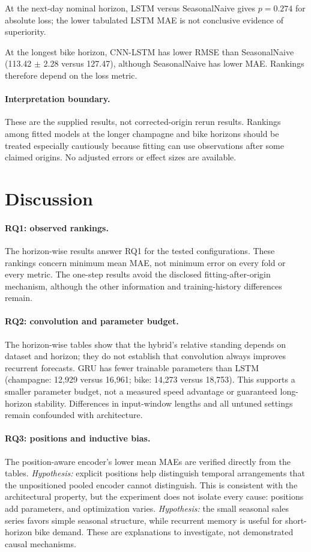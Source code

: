 \documentclass[10pt,a4paper]{article}
\begin{document}
At the next-day nominal horizon, LSTM versus SeasonalNaive gives $p=0.274$ for absolute loss; the lower tabulated LSTM MAE is not conclusive evidence of superiority.

At the longest bike horizon, CNN-LSTM has lower RMSE than SeasonalNaive (113.42 $\pm$ 2.28 versus 127.47), although SeasonalNaive has lower MAE. Rankings therefore depend on the loss metric.

\paragraph{Interpretation boundary.} These are the supplied results, not corrected-origin rerun results. Rankings among fitted models at the longer champagne and bike horizons should be treated especially cautiously because fitting can use observations after some claimed origins. No adjusted errors or effect sizes are available.

\section{Discussion}
\paragraph{RQ1: observed rankings.} The horizon-wise results answer RQ1 for the tested configurations. These rankings concern minimum mean MAE, not minimum error on every fold or every metric. The one-step results avoid the disclosed fitting-after-origin mechanism, although the other information and training-history differences remain.

\paragraph{RQ2: convolution and parameter budget.} The horizon-wise tables show that the hybrid's relative standing depends on dataset and horizon; they do not establish that convolution always improves recurrent forecasts. GRU has fewer trainable parameters than LSTM (champagne: 12,929 versus 16,961; bike: 14,273 versus 18,753). This supports a smaller parameter budget, not a measured speed advantage or guaranteed long-horizon stability. Differences in input-window lengths and all untuned settings remain confounded with architecture.

\paragraph{RQ3: positions and inductive bias.} The position-aware encoder's lower mean MAEs are verified directly from the tables. \emph{Hypothesis:} explicit positions help distinguish temporal arrangements that the unpositioned pooled encoder cannot distinguish. This is consistent with the architectural property, but the experiment does not isolate every cause: positions add parameters, and optimization varies. \emph{Hypothesis:} the small seasonal sales series favors simple seasonal structure, while recurrent memory is useful for short-horizon bike demand. These are explanations to investigate, not demonstrated causal mechanisms.
\end{document}
